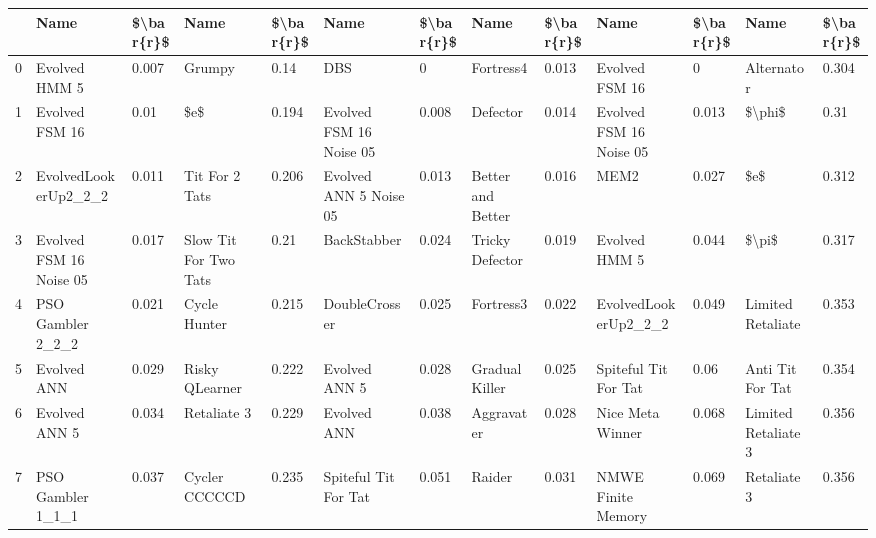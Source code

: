 \begin{tabular}{lllllllllllll}
\toprule
{} &                     Name & \$\textbackslash bar\{r\}\$ &                   Name & \$\textbackslash bar\{r\}\$ &                        Name & \$\textbackslash bar\{r\}\$ &               Name & \$\textbackslash bar\{r\}\$ &                       Name & \$\textbackslash bar\{r\}\$ &                 Name & \$\textbackslash bar\{r\}\$ \\
\midrule
0  &            Evolved HMM 5 &     0.007 &                 Grumpy &      0.14 &                         DBS &         0 &          Fortress4 &     0.013 &             Evolved FSM 16 &         0 &           Alternator &     0.304 \\
1  &           Evolved FSM 16 &      0.01 &                    \$e\$ &     0.194 &     Evolved FSM 16 Noise 05 &     0.008 &           Defector &     0.014 &    Evolved FSM 16 Noise 05 &     0.013 &               \$\textbackslash phi\$ &      0.31 \\
2  &     EvolvedLookerUp2\_2\_2 &     0.011 &         Tit For 2 Tats &     0.206 &      Evolved ANN 5 Noise 05 &     0.013 &  Better and Better &     0.016 &                       MEM2 &     0.027 &                  \$e\$ &     0.312 \\
3  &  Evolved FSM 16 Noise 05 &     0.017 &  Slow Tit For Two Tats &      0.21 &                 BackStabber &     0.024 &    Tricky Defector &     0.019 &              Evolved HMM 5 &     0.044 &                \$\textbackslash pi\$ &     0.317 \\
4  &        PSO Gambler 2\_2\_2 &     0.021 &           Cycle Hunter &     0.215 &               DoubleCrosser &     0.025 &          Fortress3 &     0.022 &       EvolvedLookerUp2\_2\_2 &     0.049 &    Limited Retaliate &     0.353 \\
5  &              Evolved ANN &     0.029 &         Risky QLearner &     0.222 &               Evolved ANN 5 &     0.028 &     Gradual Killer &     0.025 &       Spiteful Tit For Tat &      0.06 &     Anti Tit For Tat &     0.354 \\
6  &            Evolved ANN 5 &     0.034 &            Retaliate 3 &     0.229 &                 Evolved ANN &     0.038 &         Aggravater &     0.028 &           Nice Meta Winner &     0.068 &  Limited Retaliate 3 &     0.356 \\
7  &        PSO Gambler 1\_1\_1 &     0.037 &          Cycler CCCCCD &     0.235 &        Spiteful Tit For Tat &     0.051 &             Raider &     0.031 &         NMWE Finite Memory &     0.069 &          Retaliate 3 &     0.356 \\

\end{tabular}
